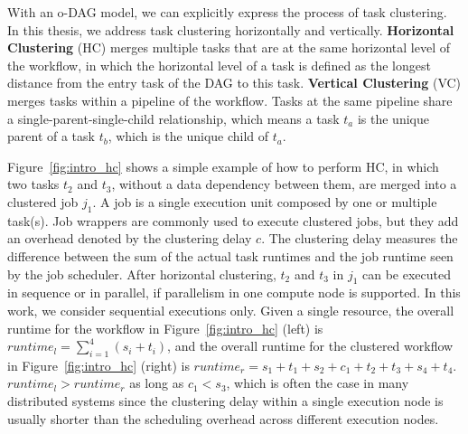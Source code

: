 



With an o-DAG model, we can explicitly express the process of task clustering. In this thesis, we address task clustering horizontally and vertically. \textbf{Horizontal Clustering} (HC) merges multiple tasks that are at the same horizontal level of the workflow, in which the horizontal level of a task is defined as the longest distance from the entry task of the DAG to this task. \textbf{Vertical Clustering} (VC) merges tasks within a pipeline of the workflow. Tasks at the same pipeline share a single-parent-single-child relationship, which means a task $t_a$ is the unique parent of a task $t_b$, which is the unique child of $t_a$. 


Figure~\ref{fig:intro_hc} shows a simple example of how to perform HC, in which two tasks $t_2$ and $t_3$, without a data dependency between them, are merged into a clustered job $j_1$. A job is a single execution unit composed by one or multiple task(s). Job wrappers are commonly used to execute clustered jobs, but they add an overhead denoted by the clustering delay $c$. The clustering delay measures the difference between the sum of the actual task runtimes and the job runtime seen by the job scheduler. 
After horizontal clustering, $t_2$ and $t_3$ in $j_1$ can be executed in sequence or in parallel, if parallelism in one compute node is supported. In this work, we consider sequential executions only. Given a single resource, the overall runtime for the workflow in Figure~\ref{fig:intro_hc} (left) is $runtime_l= \sum_{i=1}^{4}(s_i+t_i)$, and the overall runtime for the clustered workflow in Figure~\ref{fig:intro_hc} (right) is $runtime_r=s_1+t_1+s_2+c_1+t_2+t_3+s_4+t_4$.  $runtime_l > runtime_r$ as long as $c_1 < s_3$, which is often the case in many distributed systems since the clustering delay within a single execution node is usually shorter than the scheduling overhead across different execution nodes. 


